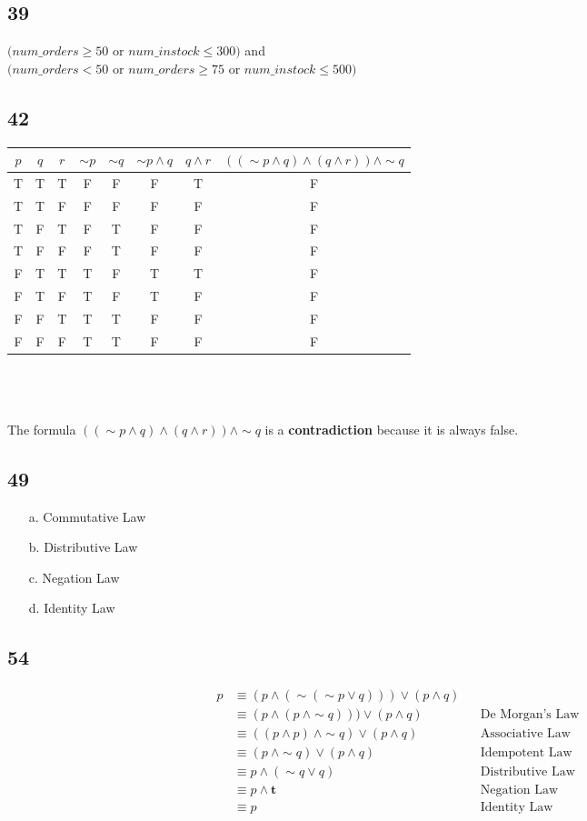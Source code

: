 \documentclass[12pt]{article}
\begin{document}
\subsection*{39}
$(num\_orders \geq 50$ or $num\_instock \leq 300)$ and 
\\ $(num\_orders < 50$ or $num\_orders \geq 75$ or $num\_instock \leq 500)$
\subsection*{42}

\begin{tabular}{c c c|c c|c|c|c}
    $p$ & $q$ & $r$ & $\sim p$ & $\sim q$ & $\sim p \wedge q$ & $q \wedge r$ & $((\sim p \wedge q)\wedge(q \wedge r))\wedge \sim q$ \\
    \hline
    T&T&T&F&F&F&T&F \\
    T&T&F&F&F&F&F&F \\
    T&F&T&F&T&F&F&F \\
    T&F&F&F&T&F&F&F \\
    F&T&T&T&F&T&T&F \\
    F&T&F&T&F&T&F&F \\
    F&F&T&T&T&F&F&F \\
    F&F&F&T&T&F&F&F \\
\end{tabular}
\\ \\ \\
The formula $((\sim p \wedge q)\wedge(q \wedge r))\wedge \sim q$ is a \textbf{contradiction} because it is always false.
\subsection*{49}
\begin{enumerate}
    \item[a.] Commutative Law
    \item[b.] Distributive Law
    \item[c.] Negation Law
    \item[d.] Identity Law
\end{enumerate}
\subsection*{54}
\begin{align*}
    p &\equiv (p \wedge (\sim(\sim p \vee q)))\vee(p \wedge q) \\
    &\equiv (p \wedge (p \ \wedge \sim q)))\vee(p \wedge q) && \text{De Morgan's Law}\\
    &\equiv ((p \wedge p) \ \wedge \sim q)\vee(p \wedge q) && \text{Associative Law}\\
    &\equiv (p \ \wedge \sim q)\vee(p \wedge q) && \text{Idempotent Law}\\
    &\equiv p \wedge (\sim q \vee q) && \text{Distributive Law}\\
    &\equiv p \wedge \textbf{t} && \text{Negation Law}\\
    &\equiv p && \text{Identity Law}
\end{align*}
\end{document}
